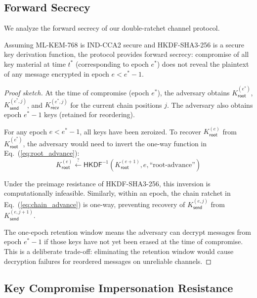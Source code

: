 \documentclass[conference,10pt]{IEEEtran}
\begin{document}
\subsection{Forward Secrecy}

We analyze the forward secrecy of our double-ratchet channel protocol.

\begin{theorem}
Assuming ML-KEM-768 is IND-CCA2 secure and HKDF-SHA3-256 is a secure key derivation function, the protocol provides forward secrecy: compromise of all key material at time $t^*$ (corresponding to epoch $e^*$) does not reveal the plaintext of any message encrypted in epoch $e < e^* - 1$.
\end{theorem}

\begin{proof}[Proof sketch]
At the time of compromise (epoch $e^*$), the adversary obtains $K_{\mathsf{root}}^{(e^*)}$, $K_{\mathsf{send}}^{(e^*,j)}$, and $K_{\mathsf{recv}}^{(e^*,j)}$ for the current chain positions $j$. The adversary also obtains epoch $e^* - 1$ keys (retained for reordering).

For any epoch $e < e^* - 1$, all keys have been zeroized. To recover $K_{\mathsf{root}}^{(e)}$ from $K_{\mathsf{root}}^{(e^*)}$, the adversary would need to invert the one-way function in Eq.~(\ref{eq:root_advance}):
\begin{equation}
    K_{\mathsf{root}}^{(e)} \stackrel{?}{\leftarrow} \mathsf{HKDF}^{-1}(K_{\mathsf{root}}^{(e+1)}, e, \text{``root-advance''})
\end{equation}

Under the preimage resistance of HKDF-SHA3-256, this inversion is computationally infeasible. Similarly, within an epoch, the chain ratchet in Eq.~(\ref{eq:chain_advance}) is one-way, preventing recovery of $K_{\mathsf{send}}^{(e,j)}$ from $K_{\mathsf{send}}^{(e,j+1)}$.

The one-epoch retention window means the adversary can decrypt messages from epoch $e^* - 1$ if those keys have not yet been erased at the time of compromise. This is a deliberate trade-off: eliminating the retention window would cause decryption failures for reordered messages on unreliable channels.
\end{proof}

\subsection{Key Compromise Impersonation Resistance}
\end{document}
